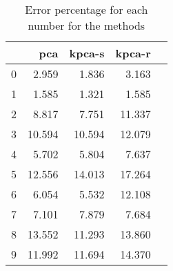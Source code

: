 \begin{table}[htb!]
    \centering
    \begin{tabular}{lrrrr}
        \toprule
          & pca    & kpca-s & kpca-r \\
        \midrule
        0 & 2.959  & 1.836  & 3.163  \\
        1 & 1.585  & 1.321  & 1.585  \\
        2 & 8.817  & 7.751  & 11.337 \\
        3 & 10.594 & 10.594 & 12.079 \\
        4 & 5.702  & 5.804  & 7.637  \\
        5 & 12.556 & 14.013 & 17.264 \\
        6 & 6.054  & 5.532  & 12.108 \\
        7 & 7.101  & 7.879  & 7.684  \\
        8 & 13.552 & 11.293 & 13.860 \\
        9 & 11.992 & 11.694 & 14.370 \\
        \bottomrule
    \end{tabular}
    \caption{Error percentage for each number for the methods}
    \label{tab:error-percentage-pca-kpca-s-kpca-r}
\end{table}